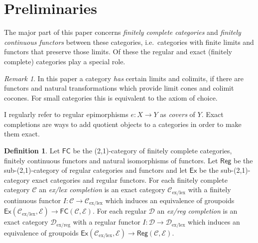 \documentclass[sort&compress]{elsarticle}
\theoremstyle{plain}
\theoremstyle{definition}
\newtheorem{defin}[theorem]{Definition}
\theoremstyle{remark}
\newtheorem{remark}[theorem]{Remark}
\newcommand\hide[1]{}
\newcommand\cat\mathcal
\newcommand\exlex{_\mathrm{ex/lex}}\newcommand\exreg{_\mathrm{ex/reg}}
\begin{document}
\hide{%
\hide{Hyland, Pitts, Frey}
My paper stays within the sandbox of finitely complete categories, but exact completions are defined for categories which are finitely complete in a weakened sense . Moreover, Michael Shulman shows that both the ex/lex and the ex/reg completion are special cases of the exact completion of a \emph{unary site} in \citet{ECnSS}, which in turn is a member of a family of colimit completion construction for sites which includes the topos of sheaves. There is much to explore here concerning completions which are toposes.

Finally, the ex/lex completion of a category has some parallels to the construction of the category of Kan complexes in the same category. In this analogy the generic monomorphism is a generic small Kan fibration. Interesting \emph{$\infty$-toposes} and other models of \emph{homotopy type theory} may arise this way.
}

\section{Preliminaries} %
The major part of this paper concerns \emph{finitely complete categories} and \emph{finitely continuous functors} between these categories, i.e.\ categories with finite limits and functors that preserve those limits. Of these the regular and exact (finitely complete) categories play a special role.

\begin{remark} In this paper a category \emph{has} certain limits and colimits, if there are functors and natural transformations which provide limit cones and colimit cocones. For small categories this is equivalent to the axiom of choice. \end{remark}

I regularly refer to regular epimorphisms $e:X\to Y$ as \emph{covers} of $Y$.
Exact completions are ways to add quotient objects to a categories in order to make them exact.

\newcommand\FC{\mathsf{FC}}
\newcommand\Reg{\mathsf{Reg}}
\newcommand\Ex{\mathsf{Ex}}
\begin{defin}
Let $\FC$ be the (2,1)-category of finitely complete categories, finitely continuous functors and natural isomorphisms of functors. Let $\Reg$ be the sub-(2,1)-category of regular categories and functors and let $\Ex$ be the sub-(2,1)-category exact categories and regular functors. For each finitely complete category $\cat C$ an \emph{ex/lex completion} is an exact category $\cat C\exlex$ with a finitely continuous functor $I:\cat C \to \cat C\exlex$ which induces an equivalence of groupoids $\Ex(\cat C\exlex,\cat E) \to \FC(\cat C,\cat E)$. For each regular $\cat D$ an \emph{ex/reg completion} is an exact category $\cat D\exreg$ with a regular functor $I:\cat D \to \cat D\exlex$ which induces an equivalence of groupoids $\Ex(\cat C\exlex,\cat E) \to \Reg(\cat C,\cat E)$.
\end{defin}
\end{document}
